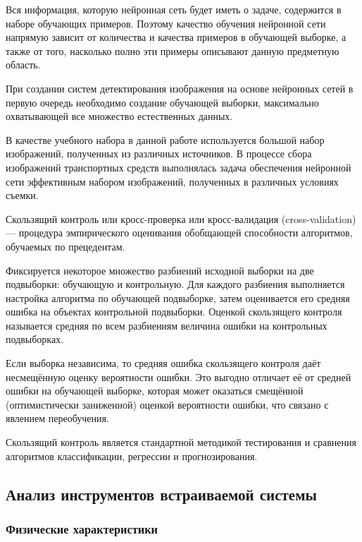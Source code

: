 Вся информация, которую нейронная сеть будет иметь о задаче, содержится в наборе обучающих примеров. Поэтому качество обучения нейронной сети напрямую зависит от количества и качества примеров в обучающей выборке, а также от того, насколько полно эти примеры описывают данную предметную область. 

При создании систем детектирования изображения на основе нейронных сетей в первую очередь необходимо создание обучающей выборки, максимально охватывающей все множество естественных данных.

В качестве учебного набора в данной работе используется большой набор изображений, полученных из различных источников. В процессе сбора изображений транспортных средств выполнялась задача обеспечения нейронной сети эффективным набором изображений, полученных в различных условиях съемки.

Скользящий контроль или кросс-проверка или кросс-валидация (cross-validation) — процедура эмпирического оценивания обобщающей способности алгоритмов, обучаемых по прецедентам.

Фиксируется некоторое множество разбиений исходной выборки на две подвыборки: обучающую и контрольную. Для каждого разбиения выполняется настройка алгоритма по обучающей подвыборке, затем оценивается его средняя ошибка на объектах контрольной подвыборки. Оценкой скользящего контроля называется средняя по всем разбиениям величина ошибки на контрольных подвыборках.

Если выборка независима, то средняя ошибка скользящего контроля даёт несмещённую оценку вероятности ошибки. Это выгодно отличает её от средней ошибки на обучающей выборке, которая может оказаться смещённой (оптимистически заниженной) оценкой вероятности ошибки, что связано с явлением переобучения.

Скользящий контроль является стандартной методикой тестирования и сравнения алгоритмов классификации, регрессии и прогнозирования.

\subsection{Анализ инструментов встраиваемой системы}

\subsubsection{Физические характеристики}

